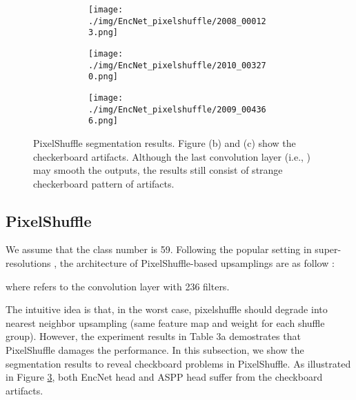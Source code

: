 \documentclass[10pt,twocolumn,letterpaper]{article}
\begin{document}
\begin{figure}[t]
\begin{subfigure}[t]{0.155\textwidth}
        \begin{subfigure}[t]{\textwidth}
                \texttt{[image: ./img/EncNet\_pixelshuffle/2008\_000123.png]}
            \end{subfigure}\vspace{.1ex}

        \begin{subfigure}[t]{\textwidth}
                \texttt{[image: ./img/EncNet\_pixelshuffle/2010\_003270.png]}
            \end{subfigure}\vspace{.1ex}

            \begin{subfigure}[t]{\textwidth}
                \texttt{[image: ./img/EncNet\_pixelshuffle/2009\_004366.png]}
	 \captionsetup{justification=centering}            
        \label{e}
            \end{subfigure}
    \end{subfigure}
        \caption{PixelShuffle segmentation results. Figure (b) and (c) show the checkerboard artifacts. Although the last convolution layer (i.e., ) may smooth the outputs, the results still consist of strange checkerboard pattern of artifacts.}
\label{pixleshuffle}
\end{figure}

\subsection{PixelShuffle}
We assume that the class number is 59. Following the popular setting in super-resolutions \cite{Lim_2017_CVPR_Workshops, ShiCHTABRW16, HeMWLY019}, the architecture of PixelShuffle-based upsamplings are as follow :

where  refers to the  convolution layer with 236 filters.

The intuitive idea is that, in the worst case, pixelshuffle should degrade into nearest neighbor upsampling (same feature map and weight for each shuffle group). However, the experiment results in Table 3a demostrates that PixelShuffle damages the performance. In this subsection, we show the segmentation results to reveal checkboard problems in PixelShuffle. As illustrated in Figure \ref{pixleshuffle}, both EncNet \cite{EncNet} head and ASPP \cite{ASPP} head suffer from the checkboard artifacts.
\end{document}
